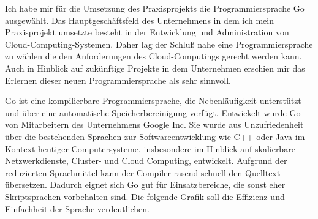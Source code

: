 \documentclass[12pt]{article}
\begin{document}
Ich habe mir für die Umsetzung des Praxisprojekts die Programmiersprache Go ausgewählt. \cite{GOLANG}
Das Hauptgeschäftsfeld des Unternehmens in dem ich mein Praxisprojekt umsetzte besteht in der Entwicklung und Administration von Cloud-Computing-Systemen. Daher lag der Schluß nahe eine Programmiersprache zu wählen die den Anforderungen des Cloud-Computings gerecht werden kann. Auch in Hinblick auf zukünftige Projekte in dem Unternehmen erschien mir das Erlernen dieser neuen Programmiersprache als sehr sinnvoll.

Go ist eine kompilierbare Programmiersprache, die Nebenläufigkeit unterstützt und über eine automatische Speicherbereinigung verfügt. Entwickelt wurde Go von Mitarbeitern des Unternehmens Google Inc. Sie wurde aus Unzufriedenheit über die bestehenden Sprachen zur Softwareentwicklung wie C++ oder Java im Kontext heutiger Computersysteme, insbesondere im Hinblick auf skalierbare Netzwerkdienste, Cluster- und Cloud Computing, entwickelt. Aufgrund der reduzierten Sprachmittel kann der Compiler rasend schnell den Quelltext übersetzen. Dadurch eignet sich Go gut für Einsatzbereiche, die sonst eher Skriptsprachen vorbehalten sind. Die folgende Grafik soll die Effizienz und Einfachheit der Sprache verdeutlichen.


\end{document}
